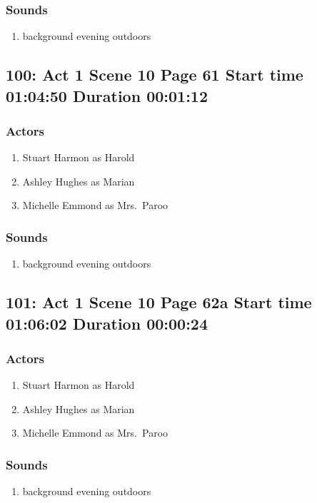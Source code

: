 \subsubsection{Sounds}
\begin{enumerate}
\item background evening outdoors
\end{enumerate}
\subsection{100: Act 1 Scene 10 Page 61 Start time 01:04:50 Duration 00:01:12}

\subsubsection{Actors}
\begin{enumerate}
\item Stuart Harmon as Harold
\item Ashley Hughes as Marian
\item Michelle Emmond as Mrs.~Paroo
\end{enumerate}

\subsubsection{Sounds}
\begin{enumerate}
\item background evening outdoors
\end{enumerate}
\subsection{101: Act 1 Scene 10 Page 62a Start time 01:06:02 Duration 00:00:24}

\subsubsection{Actors}
\begin{enumerate}
\item Stuart Harmon as Harold
\item Ashley Hughes as Marian
\item Michelle Emmond as Mrs.~Paroo
\end{enumerate}

\subsubsection{Sounds}
\begin{enumerate}
\item background evening outdoors
\end{enumerate}
